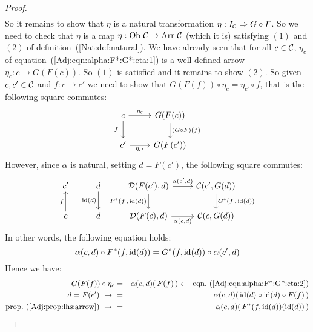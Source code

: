 \begin{proof}
\begin{eqnarray*}
        \end{eqnarray*}
    So it remains to show that $\eta$ is a natural transformation 
    $\eta:I_{\cal C}\Rightarrow G\circ F$. So we need to check that 
    $\eta$ is a map $\eta:\mbox{\rm Ob}\ \mbox{$\cal C$}\to\mbox{\rm Arr}\ \mbox{$\cal C$}$ (which it is) satisfying
    $(1)$ and $(2)$ of definition~(\ref{Nat:def:natural}). We have already
    seen that for all $c\in\mbox{$\cal C$}$, $\eta_{c}$ of
    equation~(\ref{Adj:eqn:alpha:F*:G*:eta:1}) is a well defined arrow
    $\eta_{c}:c\to G(F(c))$. So $(1)$ is satisfied and it remains to show $(2)$.
    So given $c,c'\in\mbox{$\cal C$}$ and $f:c\to c'$ we need to show that
    $G(F(f))\circ\eta_{c}=\eta_{c'}\circ f$, that is the following 
    square commutes:
        \[
            \begin{tikzcd}
                c\arrow[r, "\eta_{c}"]\arrow[d, swap,"f\ "]
                &G(F(c))\arrow[d, "(G\circ F)(f)"]
                \\
                c'\arrow[r, swap, "\eta_{c'}"]
                &G(F(c'))
            \end{tikzcd}
        \]
    However, since $\alpha$ is natural, setting $d=F(c')$, the following
    square commutes:
        \[
            \begin{tikzcd}
                c'
                &d\arrow[d,swap, "{\rm id}(d)"]
                &\Dat(F(c'),d)\arrow[r, "\alpha\mbox{$(c',d)$}"]
                \arrow[d, swap,"F^{*}\mbox{$(f\,,\,{\rm id}(d))$}"]
                &\Cat(c',G(d))
                \arrow[d, "G^{*}\mbox{$(f\,,\,{\rm id}(d))$}"]
                \\
                c\arrow[u, "f"]
                &d
                &\Dat(F(c),d)\arrow[r, swap, "\alpha\mbox{$(c,d)$}"]
                &\Cat(c,G(d))
            \end{tikzcd}
        \]
    In other words, the following equation holds:
        \begin{equation}\label{Adj:eqn:alpha:F*:G*:eta:4}
            \alpha(c,d)\circ F^{*}(f,\mbox{\rm id}(d)) = G^{*}(f,\mbox{\rm id}(d))\circ\alpha(c',d)
        \end{equation}
    Hence we have: 
        \begin{eqnarray*}G(F(f))\circ\eta_{c}
            &=&\alpha(c,d)(\,F(f)\,)
            \leftarrow\ \mbox{eqn.~(\ref{Adj:eqn:alpha:F*:G*:eta:2})}\\
            \mbox{$d=F(c')$}\ \to\ 
            &=&\alpha(c,d)(\,\id(d)\circ\id(d)\circ F(f)\,)\\
            \mbox{prop.~(\ref{Adj:prop:lhs:arrow})}\ \to\ 
            &=&\alpha(c,d)(\,F^{*}(f,\id(d))(\id(d))\,)\\

\end{eqnarray*}
\end{proof}
